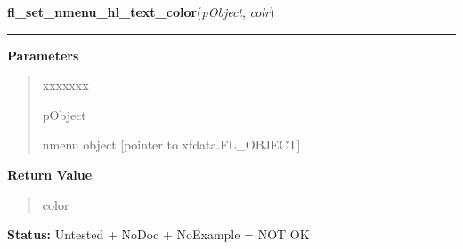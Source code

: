 \hspace{.8\funcindent}\begin{boxedminipage}{\funcwidth}

    \raggedright \textbf{fl\_set\_nmenu\_hl\_text\_color}(\textit{pObject}, \textit{colr})

    \vspace{-1.5ex}

    \rule{\textwidth}{0.5\fboxrule}
\setlength{\parskip}{2ex}
\setlength{\parskip}{1ex}
      \textbf{Parameters}
      \vspace{-1ex}

      \begin{quote}
        \begin{Ventry}{xxxxxxx}

          \item[pObject]

          nmenu object [pointer to xfdata.FL\_OBJECT]

        \end{Ventry}

      \end{quote}

      \textbf{Return Value}
    \vspace{-1ex}

      \begin{quote}
      color

      \end{quote}

\textbf{Status:} Untested + NoDoc + NoExample = NOT OK



    \end{boxedminipage}

    \label{xformslib:library:fl_add_positioner}

    \vspace{0.5ex}

